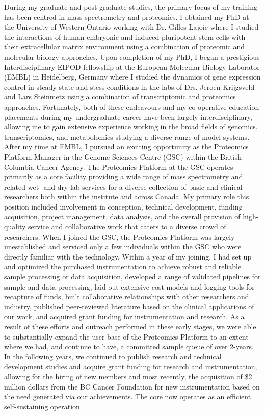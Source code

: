 \documentclass[11pt]{article}
\begin{document}
\noindent
During my graduate and post-graduate studies, the primary focus of my training has been centred in mass spectrometry and proteomics. I obtained my PhD at the University of Western Ontario working with Dr. Gilles Lajoie where I studied the interactions of human embryonic and induced pluripotent stem cells with their extracellular matrix environment using a combination of proteomic and molecular biology approaches. Upon completion of my PhD, I began a prestigious Interdisciplinary EIPOD fellowship at the European Molecular Biology Laborator (EMBL) in Heidelberg, Germany where I studied the dynamics of gene expression control in steady-state and stess conditions in the labs of Drs. Jeroen Krijgsveld and Lars Steinmetz using a combination of transcriptomic and proteomics approaches. Fortunately, both of these endeavours and my co-operative education placements during my undergraduate career have been largely interdisciplinary, allowing me to gain extensive experience working in the broad fields of genomics, transcriptomics, and metabolomics studying a diverse range of model systems.\\

\noindent
 After my time at EMBL, I pursued an exciting opportunity as the Proteomics Platform Manager in the Genome Sciences Centre (GSC) within the British Columbia Cancer Agency. The Proteomics Platform at the GSC operates primarily as a core facility providing a wide range of mass spectrometry and related wet- and dry-lab services for a diverse collection of basic and clinical researchers both within the institute and across Canada. My primary role this position included involvement in conception, technical development, funding acquisition, project management, data analysis, and the overall provision of high-quality service and collaborative work that caters to a diverse crowd of researchers. When I joined the GSC, the Proteomics Platform was largely unestablished and serviced only a few individuals within the GSC who were directly familiar with the technology. Within a year of my joining, I had set up and optimized the purchased instrumentation to achieve robust and reliable sample processing or data acquisition, developed a range of validated pipelines for sample and data processing, laid out extensive cost models and logging tools for recapture of funds, built collaborative relationships with other researchers and industry, published peer-reviewed literature based on the clinical applications of our work, and acquired grant funding for instrumentation and research. As a result of these efforts and outreach performed in these early stages, we were able to substantially expand the user base of the Proteomics Platform to an extent where we had, and continue to have, a committed sample queue of over 2-years. In the following years, we continued to publish research and technical development studies and acquire grant funding for research and instrumentation, allowing for the hiring of new members and most recently, the acquisition of \$2 million dollars from the BC Cancer Foundation for new instrumentation based on the need generated via our achievements. The core now operates as an efficient self-sustaining operation\\
\end{document}
